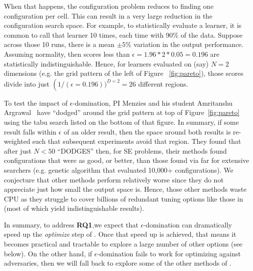 When that happens, the configuration problem reduces to finding 
one configuration per cell. This can result
in a very large reduction in the configuration search space.
For example, to statistically evaluate a learner, it is common
to call that 
 learner   10 times, each time with 90\% of the
data. Suppose across those 10 runs, there is a mean $\pm 5\%$
variation in the output performance.   Assuming normality, 
then  scores less than $\epsilon=1.96*2*0.05=0.196$ are statistically indistinguishable. Hence, for learners    evaluated on (say) $N=2$  dimensions (e.g. the grid pattern of the left of  Figure ~\ref{fig:pareto}), 
  those  scores    divide into just  $\left(1/(\epsilon = 0.196))^{D=2}=26$ different regions. 


To test the impact of $\epsilon$-domination, PI Menzies and his student Amritanshu Argrawal~\cite{dodge} have ``dodged'' around 
the grid pattern at  top of  Figure~\ref{fig:pareto}  using the tabu search listed on the bottom of that figure. In summary, if some result falls within $\epsilon$ of an older result, then the space around both results is re-weighted such that subsequent experiments avoid that region.
They found that   after  just   $N < 50$ ``DODGES'' then, for SE problems, their methods found configurations that were as good, or better, than those found
via far for extensive searchers (e.g.  genetic algorithm that evaluated 10,000+ configurations). 
We conjecture that other methods perform relatively worse since they do not appreciate just how small the output space is. Hence, those other methods waste CPU as they struggle to cover billions of redundant tuning options like those in  (most of which yield indistinguishable results).
 
 In summary, to address {\bf RQ1},we expect that  $\epsilon$-domination can dramatically speed up the {\em optimize} step of {\IT}. Once that speed up is achieved, that means it becomes practical and tractable to explore a large number of
 other options (see below).
On the other hand, if $\epsilon$-domination fails to work for optimizing  against adversaries, then we will fall back to explore some of the other methods of . 

